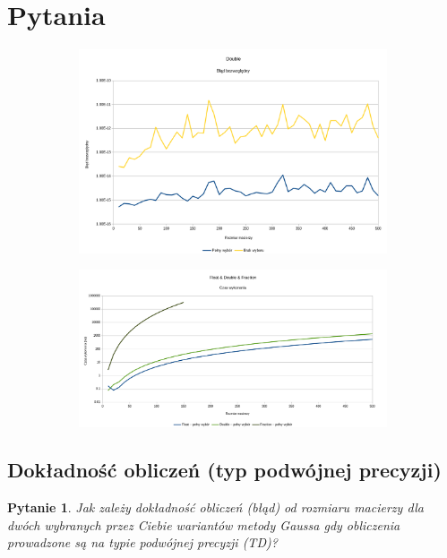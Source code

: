\documentclass[10pt]{article}
\newtheorem{que}{Pytanie}
\begin{document}
\section{Pytania}
\begin{figure}[h]
	\caption{Wykresy reprezentujące błąd bezwzględny dla różnych sposobów sumowania}
	\begin{subfigure}{0.5\textwidth}
		\includegraphics[width=\textwidth]{double_full_none_blad.png}
		\caption{ \label{Rys2a}}
	\end{subfigure}
	\hfill
	\begin{subfigure}{0.5\textwidth}
		\includegraphics[width=\textwidth]{float_double_fract_full_czas.png}
		\caption{  \label{Rys2b}}
	\end{subfigure}
\end{figure}
\subsection{Dokładność obliczeń (typ podwójnej precyzji)}
\begin{que}
	Jak zależy dokładność obliczeń (błąd) od rozmiaru macierzy dla dwóch wybranych
	przez Ciebie wariantów metody Gaussa gdy obliczenia prowadzone są na typie
	podwójnej precyzji (TD)?\label{que:1}
\end{que}
\end{document}
